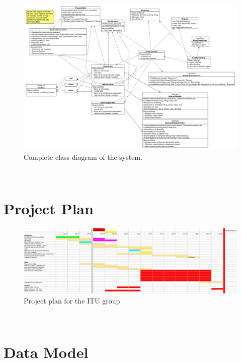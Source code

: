 \documentclass[11pt]{article}
\begin{document}
\begin{figure}[h!]
  \caption{Complete class diagram of the system.}
  \centering
    \includegraphics[width=1\textwidth, angle=270]{diagrams/class_diagram_final.png}
\end{figure}

\newpage
~\\
\newpage

\section{Project Plan}

\begin{figure}[h!]
  \caption{Project plan for the ITU group}
  \centering
    \includegraphics[width=1\textwidth, angle=270]{images/project_plan.png}
\end{figure}

\newpage
~\\
\newpage

\section{Data Model}
\end{document}
